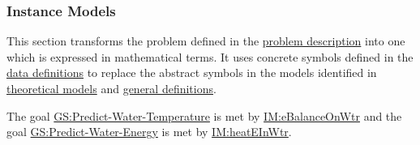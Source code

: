 \documentclass[12pt]{article}
\begin{document}
\subsubsection{Instance Models}
\label{Sec:IMs}
This section transforms the problem defined in the \hyperref[Sec:ProbDesc]{problem description} into one which is expressed in mathematical terms. It uses concrete symbols defined in the \hyperref[Sec:DDs]{data definitions} to replace the abstract symbols in the models identified in \hyperref[Sec:TMs]{theoretical models} and \hyperref[Sec:GDs]{general definitions}.

The goal \hyperref[waterTempGS]{GS:Predict-Water-Temperature} is met by \hyperref[IM:eBalanceOnWtr]{IM:eBalanceOnWtr} and the goal \hyperref[waterEnergyGS]{GS:Predict-Water-Energy} is met by \hyperref[IM:heatEInWtr]{IM:heatEInWtr}.
\end{document}

